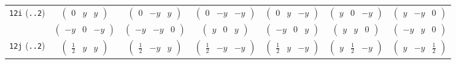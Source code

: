 \documentclass[fleqn,9pt,landscape]{jsarticle}
\begin{document}
\begin{center}
\begin{longtable}{ccccccc}
{\tt 12i} ({\tt ..2}) & $ \begin{pmatrix} 0 & y & y \end{pmatrix} $ & $ \begin{pmatrix} 0 & - y & y \end{pmatrix} $ & $ \begin{pmatrix} 0 & - y & - y \end{pmatrix} $ & $ \begin{pmatrix} 0 & y & - y \end{pmatrix} $ & $ \begin{pmatrix} y & 0 & - y \end{pmatrix} $ & $ \begin{pmatrix} y & - y & 0 \end{pmatrix} $ \\
& $ \begin{pmatrix} - y & 0 & - y \end{pmatrix} $ & $ \begin{pmatrix} - y & - y & 0 \end{pmatrix} $ & $ \begin{pmatrix} y & 0 & y \end{pmatrix} $ & $ \begin{pmatrix} - y & 0 & y \end{pmatrix} $ & $ \begin{pmatrix} y & y & 0 \end{pmatrix} $ & $ \begin{pmatrix} - y & y & 0 \end{pmatrix} $ \\ \hline
{\tt 12j} ({\tt ..2}) & $ \begin{pmatrix} \frac{1}{2} & y & y \end{pmatrix} $ & $ \begin{pmatrix} \frac{1}{2} & - y & y \end{pmatrix} $ & $ \begin{pmatrix} \frac{1}{2} & - y & - y \end{pmatrix} $ & $ \begin{pmatrix} \frac{1}{2} & y & - y \end{pmatrix} $ & $ \begin{pmatrix} y & \frac{1}{2} & - y \end{pmatrix} $ & $ \begin{pmatrix} y & - y & \frac{1}{2} \end{pmatrix} $ \\

\end{longtable}
\end{center}
\end{document}
